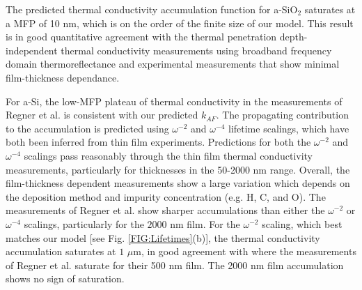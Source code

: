 \documentclass[aps,prb,onecolumn,preprint,superscriptaddress,footinbib,amsmath,amssymb,floatfix]{revtex4}
\begin{document}
The predicted thermal conductivity accumulation function for a-SiO$_2$ 
saturates at a MFP of 10 nm, which is on the order of the finite size 
of our model. This result is in good quantitative agreement 
with the thermal penetration depth-independent thermal 
conductivity measurements using broadband frequency domain 
thermoreflectance\cite{regner_broadband_2013} and experimental 
measurements that show minimal film-thickness dependance.
\cite{lee_heat_1997,yamane_measurement_2002} 

For a-Si, the low-MFP plateau of thermal conductivity in the   
measurements of Regner et al. is consistent with our 
predicted $k_{AF}$. 
The propagating contribution to the accumulation is predicted 
using $\omega^{-2}$ and $\omega^{-4}$ lifetime scalings, which 
have both been inferred from thin film experiments.
\cite{feldman_thermal_1993,cahill_thermal_1994,
feldman_numerical_1999,zink_thermal_2006,zink_excess_2006,
liu_high_2009,yang_anomalously_2010} 
Predictions for both the $\omega^{-2}$ and $\omega^{-4}$ scalings 
pass reasonably through the thin film thermal conductivity 
measurements, particularly for thicknesses in the 50-2000 nm range. 
Overall, the film-thickness dependent measurements show a large 
variation which depends on the deposition method and impurity 
concentration (e.g. H, C, and O).
\cite{vacher_attenuation_1980,liu_high_2009,yang_anomalously_2010,
li_effect_2011} 
The measurements of Regner et al. show sharper accumulations 
than either the $\omega^{-2}$ or $\omega^{-4}$ scalings, 
particularly for the $2000$ nm film. 
For the $\omega^{-2}$ scaling, which best matches our model 
[see Fig. \ref{FIG:Lifetimes}(b)], 
the thermal conductivity accumulation 
saturates at $1$ $\mu$m, in good agreement with where the measurements 
of Regner et al. saturate for their 500 nm film. The 2000 nm 
film accumulation shows no sign of saturation. 


\end{document}
